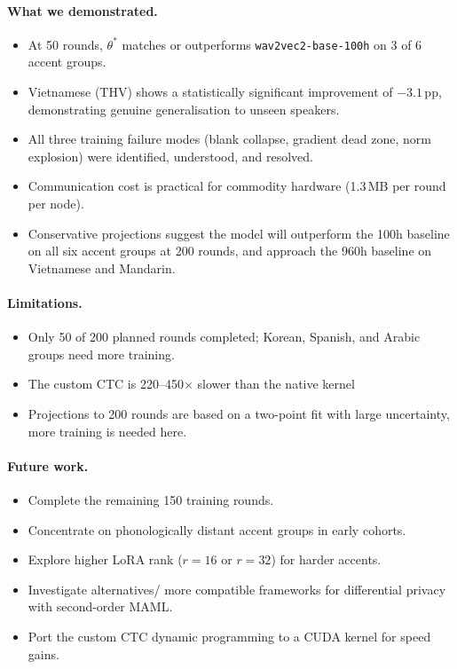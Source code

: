 \documentclass[12pt]{article}
\theoremstyle{plain}
\begin{document}
\paragraph{What we demonstrated.}
\begin{itemize}
  \item At 50 rounds, $\theta^*$ matches or outperforms \texttt{wav2vec2-base-100h}
        on 3 of 6 accent groups.
  \item Vietnamese (THV) shows a statistically significant improvement of
        $-3.1$\,pp, demonstrating genuine generalisation to unseen speakers.
  \item All three training failure modes (blank collapse, gradient dead zone,
        norm explosion) were identified, understood, and resolved.
  \item Communication cost is practical for commodity hardware
        (1.3\,MB per round per node).
  \item Conservative projections suggest the model will outperform the 100h baseline
        on all six accent groups at 200 rounds, and approach the 960h baseline on
        Vietnamese and Mandarin.
\end{itemize}

\paragraph{Limitations.}
\begin{itemize}
  \item Only 50 of 200 planned rounds completed; Korean, Spanish, and Arabic
        groups need more training.
  \item The custom CTC is 220--450$\times$ slower than the native kernel
  \item Projections to 200 rounds are based on a two-point fit with large uncertainty, more training is needed here.
\end{itemize}

\paragraph{Future work.}
\begin{itemize}
  \item Complete the remaining 150 training rounds.
  \item Concentrate on phonologically distant
        accent groups in early cohorts.
  \item Explore higher LoRA rank ($r = 16$ or $r = 32$) for harder accents.
  \item Investigate alternatives/ more compatible frameworks for differential privacy with second-order MAML.
  \item Port the custom CTC dynamic programming to a CUDA kernel for speed gains.
\end{itemize}

\newpage


\end{document}
